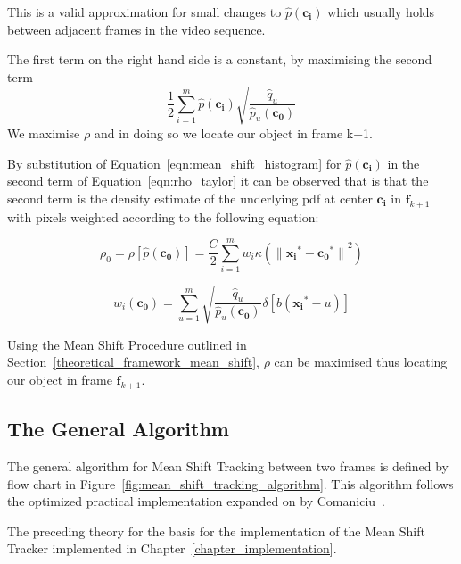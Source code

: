This is a valid approximation for small changes to $\hat{p}(\mathbf{c_i})$
which usually holds between adjacent frames in the video sequence. 

The first term on the right hand side is a constant, by maximising the second
term 
\[\frac{1}{2}\sum_{i=1}^{m}\hat{p}(\mathbf{c_i})\sqrt{\frac{\hat{q}_u}{\hat{p}_u(\mathbf{c_0})}}\]
We maximise $\rho$ and in doing so we locate our object in frame k+1.

By substitution of Equation~\ref{eqn:mean_shift_histogram} for $\hat{p}(\mathbf{c_i})$ in
the second term of Equation~\ref{eqn:rho_taylor} it can be observed that is that the
second term is the density estimate of the underlying pdf at center
$\mathbf{c_i}$ in $\mathbf{f}_{k+1}$ with pixels weighted according to the
following equation:

\[\rho_0=\rho[\hat{p}(\mathbf{c_0})]=\frac{C}{2}\sum_{i=1}^{m}w_i\kappa({\parallel{\mathbf{x_i}^*}-{\mathbf{c_0}^*}\parallel}^2)\]

\begin{equation}\label{eqn:mean_shift_weights}
    w_i(\mathbf{c_0})=\sum_{u=1}^{m}\sqrt{\frac{\hat{q}_u}{\hat{p}_u(\mathbf{c_0})}}\delta[b(\mathbf{x_i}^*-u)]
\end{equation}

Using the Mean Shift Procedure outlined in Section~\ref{theoretical_framework_mean_shift}, $\rho$ can be maximised thus locating
our object in frame $\mathbf{f}_{k+1}$.

\subsection{The General Algorithm}\label{theoretical_framework_mean_shift_algorithm}
The general algorithm for Mean Shift Tracking between two frames is defined by
flow chart in Figure~\ref{fig:mean_shift_tracking_algorithm}. This algorithm follows
the optimized practical implementation expanded on by Comaniciu~\cite{Comaniciu2003}. 


The preceding theory for the basis for the implementation of the Mean Shift
Tracker implemented in Chapter~\ref{chapter_implementation}.
